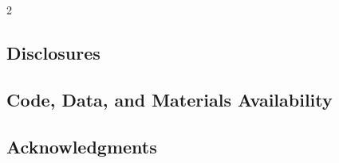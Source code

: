\documentclass[12pt]{spieman}  %
\begin{document}
\begin{spacing}{2}
\subsection*{Disclosures}


\subsection*{Code, Data, and Materials Availability}


\subsection*{Acknowledgments}




\listoffigures
\listoftables

\end{spacing}
\end{document}
